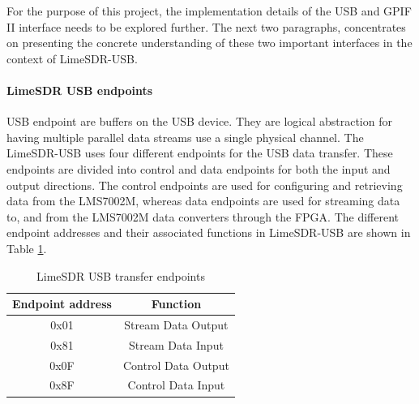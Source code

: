 For the purpose of this project, the implementation details of the USB and GPIF II interface needs to be explored further.
The next two paragraphs, concentrates on presenting the concrete understanding of these two important interfaces in the context of LimeSDR-USB.

\paragraph{LimeSDR USB endpoints}
\ac{USB} endpoint are buffers on the \ac{USB} device.
They are logical abstraction for having multiple parallel data streams use a single physical channel.
The LimeSDR-USB uses four different endpoints for the USB data transfer.
These endpoints are divided into control and data endpoints for both the input and output directions.
The control endpoints are used for configuring and retrieving data from the LMS7002M, whereas data endpoints are used for streaming data to, and from the LMS7002M data converters through the \ac{FPGA}.
The different endpoint addresses and their associated functions in LimeSDR-USB are shown in Table \ref{Lime-USB_ep}.\\

\begin{table}[h!]
\centering
\begin{tabular}{|c|c|}
\hline
Endpoint address & Function\\
\hline
0x01 & Stream Data Output\\
0x81 & Stream Data Input\\
0x0F & Control Data Output\\
0x8F & Control Data Input\\
\hline
\end{tabular}
\caption{LimeSDR USB transfer endpoints}
\label{Lime-USB_ep}
\end{table}



